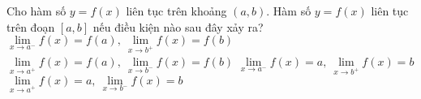 \begin{ex}%
	Cho hàm số $ y=f(x) $ liên tục trên khoảng $ (a,b) $. Hàm số $ y=f(x) $ liên tục trên đoạn $ [a,b] $ nếu điều kiện nào sau đây xảy ra?
	\choice
	{$\lim\limits_{x \to {a^ - }} f\left( x \right) = f\left( a \right),\ \lim\limits_{x \to {b^ + }} f\left( x \right) = f\left( b \right)$}
	{\True $\lim\limits_{x \to {a^ + }} f\left( x \right) = f\left( a \right),\ \lim\limits_{x \to {b^ - }} f\left( x \right) = f\left( b \right)$}
	{$\lim\limits_{x \to {a^ - }} f\left( x \right) = a,\ \lim\limits_{x \to {b^ + }} f\left( x \right) = b$}
	{$\lim\limits_{x \to {a^ + }} f\left( x \right) = a,\ \lim\limits_{x \to {b^ - }} f\left( x \right) = b$}
	\end{ex}
	
